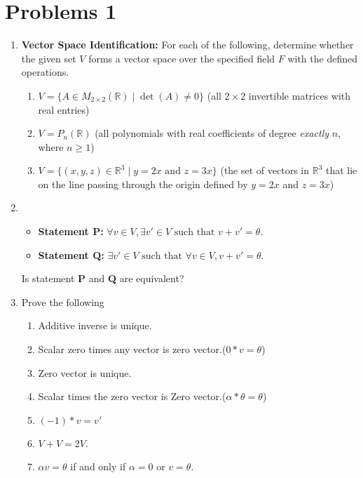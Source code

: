 \documentclass{article}
\begin{document}
\section*{Problems 1}

\begin{enumerate} %
    \item \textbf{Vector Space Identification:}
    For each of the following, determine whether the given set $V$ forms a vector space over the specified field $F$ with the defined operations.

    \begin{enumerate}
        \item
        $V = \{A \in M_{2 \times 2}(\mathbb{R}) \mid \det(A) \neq 0\}$ (all $2 \times 2$ invertible matrices with real entries)

        \item
        $V = P_n(\mathbb{R})$ (all polynomials with real coefficients of degree \textit{exactly} $n$, where $n \ge 1$)

        

        \item
         $V = \{(x, y, z) \in \mathbb{R}^3 \mid y = 2x \text{ and } z = 3x\}$ (the set of vectors in $\mathbb{R}^3$ that lie on the line passing through the origin defined by $y=2x$ and $z=3x$)
    \end{enumerate}

     \item \begin{itemize}
        \item \textbf{Statement P:} $\forall v \in V, \exists v' \in V \text{ such that } v + v' = \theta$.
        \item \textbf{Statement Q:} $\exists v' \in V \text{ such that } \forall v \in V, v + v' = \theta$.
        \end{itemize}
        Is statement \textbf{P} and \textbf{Q} are equivalent?
\item Prove the following 
\begin{enumerate}
        \item Additive inverse is unique.
        \item Scalar zero times any vector is zero vector.($0*v=\theta$)
        \item Zero vector is unique.
        \item Scalar times the zero vector is Zero vector.($\alpha*\theta=\theta$)
        \item $(-1)*v=v'$
        \item $V+V=2V$.
        \item $\alpha v=\theta$ if and only if $\alpha=0$ or $v=\theta$.
     \end{enumerate}
     
   
\vspace{1cm} %
\end{enumerate}
\end{document}
